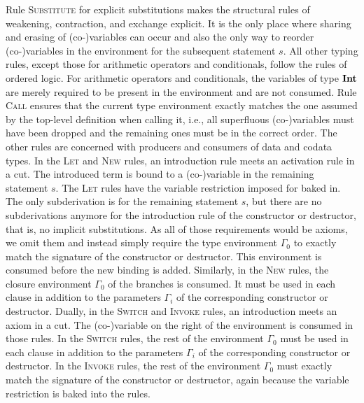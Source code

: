 Rule \textsc{Substitute} for explicit substitutions makes the structural rules of weakening, contraction, and exchange explicit.
It is the only place where sharing and erasing of (co-)variables can occur and also the only way to reorder (co-)variables in the environment for the subsequent statement $s$.
All other typing rules, except those for arithmetic operators and conditionals, follow the rules of ordered logic.
For arithmetic operators and conditionals, the variables of type $\mathbf{Int}$ are merely required to be present in the environment and are not consumed.
Rule \textsc{Call} ensures that the current type environment exactly matches the one assumed by the top-level definition when calling it, i.e., all superfluous (co-)variables must have been dropped and the remaining ones must be in the correct order.
The other rules are concerned with producers and consumers of data and codata types.
In the \textsc{Let} and \textsc{New} rules, an introduction rule meets an activation rule in a cut.
The introduced term is bound to a (co-)variable in the remaining statement $s$.
The \textsc{Let} rules have the variable restriction imposed for \targetvar{} baked in.
The only subderivation is for the remaining statement $s$, but there are no subderivations anymore for the introduction rule of the constructor or destructor, that is, no implicit substitutions.
As all of those requirements would be axioms, we omit them and instead simply require the type environment $\Gamma_0$ to exactly match the signature of the constructor or destructor.
This environment is consumed before the new binding is added.
Similarly, in the \textsc{New} rules, the closure environment $\Gamma_0$ of the branches is consumed.
It must be used in each clause in addition to the parameters $\Gamma_i$ of the corresponding constructor or destructor.
Dually, in the \textsc{Switch} and \textsc{Invoke} rules, an introduction meets an axiom in a cut.
The (co-)variable on the right of the environment is consumed in those rules.
In the \textsc{Switch} rules, the rest of the environment $\Gamma_0$ must be used in each clause in addition to the parameters $\Gamma_i$ of the corresponding constructor or destructor.
In the \textsc{Invoke} rules, the rest of the environment $\Gamma_0$ must exactly match the signature of the constructor or destructor, again because the variable restriction is baked into the rules.


